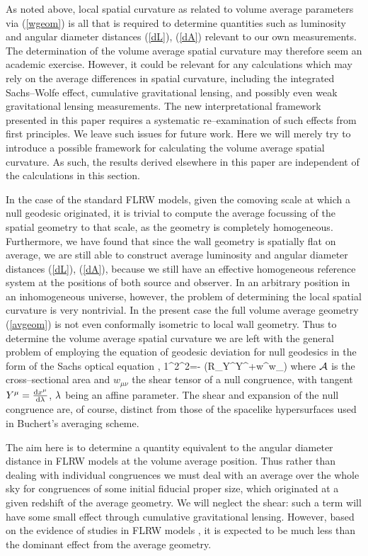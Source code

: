 \documentclass[12pt]{article}
\begin{document}
As noted above, local spatial curvature as related to volume average
parameters via (\ref{wgeom}) is all that is required to determine quantities
such as luminosity and angular diameter distances (\ref{dL}), (\ref{dA})
relevant to our own measurements. The determination of the volume average
spatial curvature may therefore seem an academic exercise. However, it could
be relevant for any calculations which may rely on the average differences in
spatial curvature, including the integrated Sachs--Wolfe effect, cumulative
gravitational lensing, and possibly even weak gravitational lensing
measurements. The new interpretational framework presented in this paper
requires a systematic re--examination of such effects from first principles.
We leave such issues for future work. Here we will merely try to introduce
a possible framework for calculating the volume average spatial curvature.
As such, the results derived elsewhere in this paper are independent of
the calculations in this section.

In the case of the standard FLRW models,
given the comoving scale at which a null geodesic originated,
it is trivial to compute the average focussing of the spatial geometry to that
scale, as the geometry is completely homogeneous. Furthermore, we have found
that since the wall geometry is spatially flat on average, we are still able
to construct average luminosity and angular diameter distances (\ref{dL}),
(\ref{dA}), because we still have an effective homogeneous reference system
at the positions of both source and observer. In an arbitrary position in an
inhomogeneous universe, however, the problem of determining the local
spatial curvature is very nontrivial. In the present case the full volume
average geometry (\ref{avgeom}) is not even conformally isometric to local
wall geometry. Thus to determine the volume average spatial curvature
we are left with the general problem of employing the equation of geodesic
deviation for null geodesics in the form of the Sachs optical equation
\cite{Peebles},
\beq
{1\over{}}{\dd^2\over\dd\la^2}=-\half
\left({\cal R}_{\mu\nu}Y^\mu Y^\nu+w^{\mu\nu}w_{\mu\nu}\right)
\label{sachs}\eeq
where $\cal A$ is the cross--sectional area and $w_{\mu\nu}$ the shear tensor
of a null congruence, with tangent $Y^\mu={{\rm d} x^\mu\over{\rm d}\lambda}$,
$\lambda$ being an affine parameter. The shear and expansion of the null
congruence are, of course, distinct from those of the spacelike hypersurfaces
used in Buchert's averaging scheme.

The aim here is to determine a quantity equivalent to the angular diameter
distance in FLRW models at the volume average position. Thus rather than
dealing with individual congruences we must deal with an average over the
whole sky for congruences of some initial fiducial proper size, which
originated at a given redshift of the average geometry. We will neglect the
shear: such a term will have some small effect through cumulative
gravitational lensing. However, based on the evidence of studies
in FLRW models \cite{lensing1}, it is expected to be much less than
the dominant effect from the average geometry.
\end{document}
